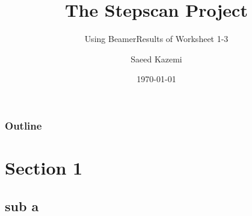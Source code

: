 \documentclass{beamer}
\subtitle{Using Beamer}
\title{The Stepscan Project}
\subtitle{Results of Worksheet 1-3}
\date{\today}
\author{Saeed Kazemi}
\institute{University of New Brunswick}
\begin{document}
\begin{frame}
\titlepage
\end{frame}


\begin{frame}
\frametitle{Outline}
\tableofcontents
\end{frame}

\section{Section 1}
\subsection{sub a}
\end{document}
